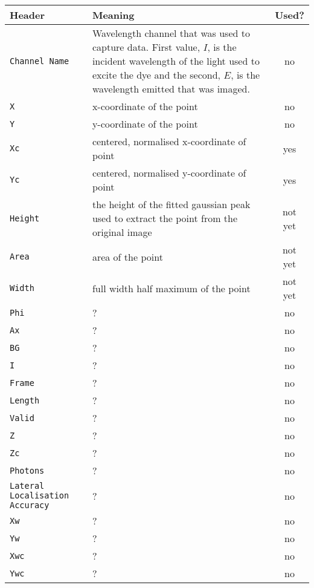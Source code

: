\begin{center}
	\begin{tabu}{p{1.1cm} X c}
		\toprule
		Header & Meaning & Used? \\
		\midrule
		\texttt{Channel Name} & Wavelength channel that was used to capture data.
			First value, $I$, is the incident wavelength of the light used to
			excite the dye and the second, $E$, is the wavelength emitted that
			was imaged. & no \\
		\texttt{X} & x-coordinate of the point & no \\
		\texttt{Y} & y-coordinate of the point & no \\
		\texttt{Xc} & centered, normalised x-coordinate of point & yes \\
		\texttt{Yc} & centered, normalised y-coordinate of point & yes \\
		\texttt{Height} & the height of the fitted gaussian peak used to
			extract the point from the original image & not yet \\
		\texttt{Area} & area of the point & not yet \\
		\texttt{Width} & full width half maximum of the point & not yet \\
		\texttt{Phi}          & ? & no \\
		\texttt{Ax}           & ? & no \\
		\texttt{BG}           & ? & no \\
		\texttt{I}            & ? & no \\
		\texttt{Frame}        & ? & no \\
		\texttt{Length}       & ? & no \\
		\texttt{Valid}        & ? & no \\
		\texttt{Z}            & ? & no \\
		\texttt{Zc}           & ? & no \\
		\texttt{Photons}      & ? & no \\
		\texttt{Lateral Localisation Accuracy}     & ? & no \\
		\texttt{Xw}           & ? & no \\
		\texttt{Yw}           & ? & no \\
		\texttt{Xwc}          & ? & no \\
		\texttt{Ywc}          & ? & no \\
		\bottomrule
	\end{tabu}
\end{center}
